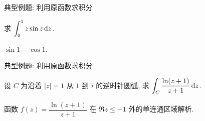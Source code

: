 \begin{frame}{典型例题: 利用原函数求积分}
\onslide<+->
\begin{exercise}
求 $\displaystyle\int_0^1 z\sin z\,\mathrm{d} z$.
\end{exercise}
\onslide<+->

\begin{answer}
$\sin 1-\cos 1$.
\end{answer}
\end{frame}


\begin{frame}{典型例题: 利用原函数求积分}
\onslide<+->
\begin{example}
设 $C$ 为沿着 $|z|=1$ 从 $1$ 到 $i$ 的逆时针圆弧, 求 $\displaystyle\int_C\frac{\ln(z+1)}{z+1}\,\mathrm{d} z$.
\end{example}
\onslide<+->
\begin{solution}
函数 $f(z)=\dfrac{\ln(z+1)}{z+1}$ 在 $\Re z\le -1$ 外的单连通区域解析.
\vspace{-0.5\baselineskip}
\onslide<+->{
  \[\int\frac{\ln(z+1)}{z+1}\diff z
=\int\ln(z+1)\diff[\ln(z+1)]=\frac12\ln^2(z+1)+c.\]}
\vspace{-1.1\baselineskip}
\end{solution}
\end{frame}


